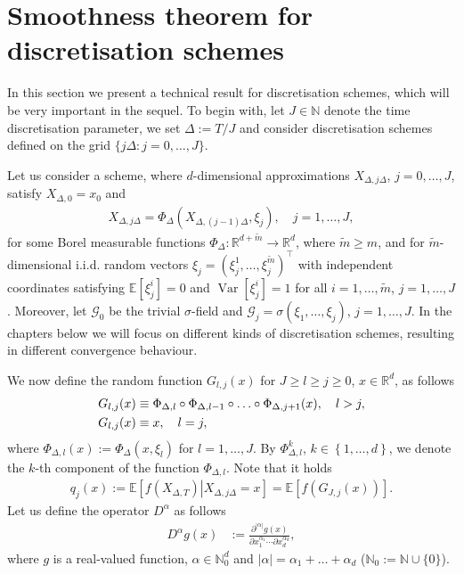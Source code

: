 \documentclass[11pt,a4paper]{amsart}
\theoremstyle{plain}
\theoremstyle{definition}
\theoremstyle{remark}
\numberwithin{equation}{section}
\newcommand*{\Var}{\operatorname{Var}}
\newcommand*{\EE}{\mathbb E}
\newcommand*{\RR}{\mathbb R}
\newcommand*{\NN}{\mathbb{N}}
\newcommand*{\bbN}{\mathbb N}
\newcommand*{\bbR}{\mathbb R}
\newcommand*{\cG}{\mathcal G}
\renewcommand*{\doteq}{:=}
\begin{document}
\section{Smoothness theorem for discretisation schemes}
\label{sec:discr}
In this section we present a technical result for discretisation schemes, which will be very important in the sequel.
To begin with, let
$J\in\bbN$ denote the time discretisation parameter,
we set $\Delta\doteq T/J$
and consider discretisation schemes
defined on the grid
$\{j\Delta:j=0,\ldots,J\}$. 

Let us consider a scheme,
where $d$-dimensional approximations
$X_{\Delta,j\Delta}$,
$j=0,\ldots,J$, satisfy $X_{\Delta,0}=x_0$ and
\begin{align}
\label{smooth:eq:defX}
    X_{\Delta, j\Delta} 
    = 
    \Phi_{\Delta}\left(
       X_{\Delta, (j-1)\Delta},\xi_j\right),\quad j=1,\ldots,J,
\end{align}
for some Borel measurable functions
$\Phi_{\Delta}\colon\bbR^{d+ \tilde m}\to\bbR^d$, where $\tilde m\ge m$, and for $\tilde m$-dimensional
i.i.d. random vectors $\xi_j=(\xi_j^1,\ldots,\xi_j^{\tilde m})^\top$ with independent coordinates satisfying $\EE\left[\xi_j^i\right]=0$ and $\Var\left[\xi_j^i\right]=1$ for all $i=1,\ldots,\tilde m$, $j=1,\ldots,J$. Moreover, let $\cG_0$ be the trivial $\sigma$-field
and $\cG_j=\sigma(\xi_1,\ldots,\xi_j)$, $j=1,\ldots,J$. In the chapters below we will focus on different kinds of discretisation schemes, resulting in different convergence behaviour.

We now define the random function $G_{l,j}(x)$ for $J\ge l\ge j\ge 0$, $x\in\RR^d$, as follows
\begin{align}
\label{smooth:def_G}
G_{l,j}(x)&\equiv\Phi_{\Delta,l}\circ\Phi_{\Delta,l-1}\circ\ldots\circ
\Phi_{\Delta,{j+1}}(x),\quad l>j,\\
\notag
G_{l,j}(x)&\equiv x,\quad l=j,
\end{align}
where $\Phi_{\Delta,l}(x)\doteq\Phi_{\Delta}\left(x,\xi_l\right)$ for $l=1,\ldots,J$. By $\Phi_{\Delta,l}^k$, $k\in\left\{1,\ldots,d\right\}$, we denote the $k$-th component of the function $\Phi_{\Delta,l}$. 
Note that 
it holds 
\begin{align}
\label{smooth:rel_uG}
q_j(x):=\EE\left[f(X_{\Delta,T})\left|X_{\Delta,j\Delta}\right.=x\right]=\EE\left[f(G_{J,j}(x))\right].
\end{align}
Let us define the operator $D^\alpha$ as follows
\begin{align}
\label{smooth:operat_D}
D^\alpha g(x)
&\doteq
\frac{\partial^{\left|\alpha\right|}g(x)}{\partial x_1^{\alpha_1}\cdots\partial x_d^{\alpha_{d}}},
\end{align}
where $g$ is a real-valued function, $\alpha\in\NN_0^{d}$ and $\left|\alpha\right|=\alpha_1+\ldots+\alpha_d$
($\NN_0:=\NN\cup\{0\}$).
\end{document}
